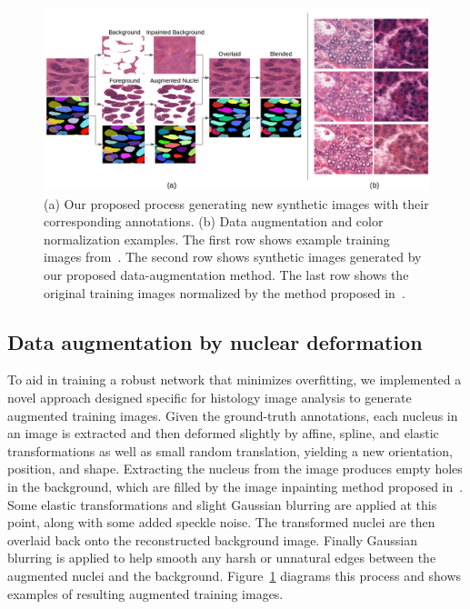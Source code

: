 \begin{figure}[thb]
    \centering
    \includegraphics[width=\textwidth]{resources/4_data_augmentation.png}
    \caption{(a) Our proposed process generating new synthetic images with their corresponding annotations. 
    (b) Data augmentation and color normalization examples.
    The first row shows example training images from~\cite{he_dataset_kumar}.
    The second row shows synthetic images generated by our proposed data-augmentation method.
    The last row shows the original training images normalized by the method proposed in~\cite{7164042}.
    }
    \label{fig:generate_new_data}
\end{figure}

\subsection{Data augmentation by nuclear deformation}

To aid in training a robust network that minimizes overfitting, we implemented a novel approach designed specific for histology image analysis to generate augmented training images.
Given the ground-truth annotations, each nucleus in an image is extracted and then deformed slightly by affine, spline, and elastic transformations as well as small random translation, yielding a new orientation, position, and shape.
Extracting the nucleus from the image produces empty holes in the background, which are filled by the image inpainting method proposed in~\cite{DBLP:journals/corr/abs-1801-07892}.
Some elastic transformations and slight Gaussian blurring are applied at this point, along with some added speckle noise.
The transformed nuclei are then overlaid back onto the reconstructed background image.
Finally Gaussian blurring is applied to help smooth any harsh or unnatural edges between the augmented nuclei and the background.
Figure~\ref{fig:generate_new_data} diagrams this process and shows examples of resulting augmented training images. 

